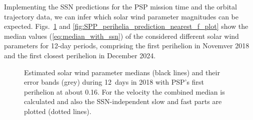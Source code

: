Implementing the SSN predictions for the PSP mission time and the orbital trajectory data, we can infer which solar wind parameter magnitudes can be expected. Figs.~\ref{fig:SPP_perihelia_prediction_f_plot} and \ref{fig:SPP_perihelia_prediction_nearest_f_plot} show the median values (\ref{eq:median_with_ssn}) of the considered different solar wind parameters for 12-day periods, comprising the first perihelion in Novemver 2018 and the first closest perihelion in December 2024.
\begin{figure}
	\caption{Estimated solar wind parameter medians (black lines) and their error bands (grey) during 12~days in 2018 with PSP's first perihelion at about \SI{0.16}{\au}. For the velocity the combined median is calculated and also the SSN-independent slow and fast parts are plotted (dotted lines).}
	\label{fig:SPP_perihelia_prediction_f_plot}
\end{figure}
